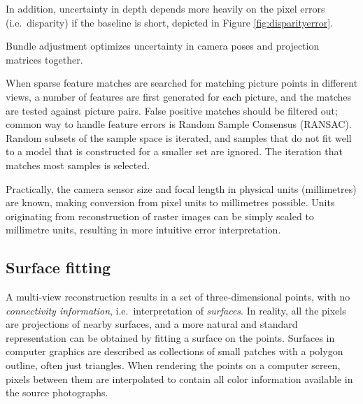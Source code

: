 In addition, uncertainty in depth depends more heavily on the pixel errors (i.e.\ disparity) if the baseline is short, depicted in Figure \ref{fig:disparityerror}. %

Bundle adjustment optimizes uncertainty in camera poses and projection matrices together.

When sparse feature matches are searched for matching picture points in different views, a number of features are first generated for each picture, and the matches are tested against picture pairs.
False positive matches should be filtered out; common way to handle feature errors is Random Sample Consensus (RANSAC).
Random subsets of the sample space is iterated, and samples that do not fit well to a model that is constructed for a smaller set are ignored.
The iteration that matches most samples is selected. \cite{hartley03multiview}


Practically, the camera sensor size and focal length in physical units (millimetres) are known, making conversion from pixel units to millimetres possible.
Units originating from reconstruction of raster images can be simply scaled to millimetre units, resulting in more intuitive error interpretation.




\subsection{Surface fitting} %

A multi-view reconstruction results in a set of three-dimensional points, with no \emph{connectivity information}, i.e.\ interpretation of \emph{surfaces}.
In reality, all the pixels are projections of nearby surfaces, and a more natural and standard representation can be obtained by fitting a surface on the points.
Surfaces in computer graphics are described as collections of small patches with a polygon outline, often just triangles.
When rendering the points on a computer screen, pixels between them are interpolated to contain all color information available in the source photographs.

